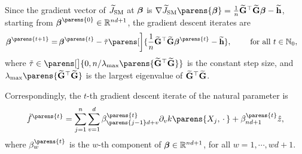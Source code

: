 	Since the gradient vector of $\widetilde{J}_{\mathrm{SM}}$ at $\boldsymbol{\beta}$ is $\nabla \widetilde{J}_{\SM} \parens{\bbeta} = \frac{1}{n} \widetilde{\bG}^\top \widetilde{\bG} \bbeta - \widetilde{\bh}$, starting from $\bbeta^{\parens{0}} \in \Real^{nd+1}$, the gradient descent iterates are 
	\begin{align*} %
		\bbeta^{\parens{t+1}} = & \, \bbeta^{\parens{t}} - \tilde{\tau} \parens[\bigg]{\frac{1}{n} \widetilde{\bG}^\top \widetilde{\bG} \bbeta^{\parens{t}} - \widetilde{\bh}}, \qquad \text{ for all } t \in \Natural_0, 
	\end{align*}
	where $\tilde{\tau} \in \parens[\big]{0, n / \lambda_{\max} \parens{\widetilde{\bG}^\top \widetilde{\bG}}}$ is the constant step size, and $\lambda_{\max} \parens{\widetilde{\bG}^\top \widetilde{\bG}}$ is the largest eigenvalue of $\widetilde{\mathbf{G}}^\top \widetilde{\mathbf{G}}$. 
	
	Correspondingly, the $t$-th gradient descent iterate of the natural parameter is 
	\begin{align*}
		\tilde{f}^{\parens{t}} = \sum_{j=1}^n \sum_{v=1}^d \beta_{\parens{j-1}d+v}^{\parens{t}} \partial_v k \parens{X_j, \,\cdot\,} + \beta_{nd+1}^{\parens{t}} \hat{z}, 
	\end{align*}
	where $\beta_{w}^{\parens{t}}$ is the $w$-th component of $\boldsymbol{\beta} \in \mathbb{R}^{nd+1}$, for all $w = 1, \cdots, wd+1$. 
%	


